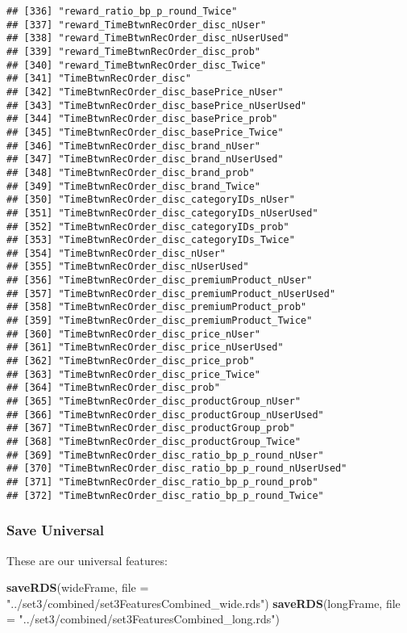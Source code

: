 \documentclass[10pt]{report}
\newenvironment{Shaded}{}{}
\newcommand{\KeywordTok}[1]{\textcolor[rgb]{0.00,0.44,0.13}{\textbf{{#1}}}}
\newcommand{\DataTypeTok}[1]{\textcolor[rgb]{0.56,0.13,0.00}{{#1}}}
\newcommand{\StringTok}[1]{\textcolor[rgb]{0.25,0.44,0.63}{{#1}}}
\newcommand{\NormalTok}[1]{{#1}}
\begin{document}
\begin{verbatim}
## [336] "reward_ratio_bp_p_round_Twice"                      
## [337] "reward_TimeBtwnRecOrder_disc_nUser"                 
## [338] "reward_TimeBtwnRecOrder_disc_nUserUsed"             
## [339] "reward_TimeBtwnRecOrder_disc_prob"                  
## [340] "reward_TimeBtwnRecOrder_disc_Twice"                 
## [341] "TimeBtwnRecOrder_disc"                              
## [342] "TimeBtwnRecOrder_disc_basePrice_nUser"              
## [343] "TimeBtwnRecOrder_disc_basePrice_nUserUsed"          
## [344] "TimeBtwnRecOrder_disc_basePrice_prob"               
## [345] "TimeBtwnRecOrder_disc_basePrice_Twice"              
## [346] "TimeBtwnRecOrder_disc_brand_nUser"                  
## [347] "TimeBtwnRecOrder_disc_brand_nUserUsed"              
## [348] "TimeBtwnRecOrder_disc_brand_prob"                   
## [349] "TimeBtwnRecOrder_disc_brand_Twice"                  
## [350] "TimeBtwnRecOrder_disc_categoryIDs_nUser"            
## [351] "TimeBtwnRecOrder_disc_categoryIDs_nUserUsed"        
## [352] "TimeBtwnRecOrder_disc_categoryIDs_prob"             
## [353] "TimeBtwnRecOrder_disc_categoryIDs_Twice"            
## [354] "TimeBtwnRecOrder_disc_nUser"                        
## [355] "TimeBtwnRecOrder_disc_nUserUsed"                    
## [356] "TimeBtwnRecOrder_disc_premiumProduct_nUser"         
## [357] "TimeBtwnRecOrder_disc_premiumProduct_nUserUsed"     
## [358] "TimeBtwnRecOrder_disc_premiumProduct_prob"          
## [359] "TimeBtwnRecOrder_disc_premiumProduct_Twice"         
## [360] "TimeBtwnRecOrder_disc_price_nUser"                  
## [361] "TimeBtwnRecOrder_disc_price_nUserUsed"              
## [362] "TimeBtwnRecOrder_disc_price_prob"                   
## [363] "TimeBtwnRecOrder_disc_price_Twice"                  
## [364] "TimeBtwnRecOrder_disc_prob"                         
## [365] "TimeBtwnRecOrder_disc_productGroup_nUser"           
## [366] "TimeBtwnRecOrder_disc_productGroup_nUserUsed"       
## [367] "TimeBtwnRecOrder_disc_productGroup_prob"            
## [368] "TimeBtwnRecOrder_disc_productGroup_Twice"           
## [369] "TimeBtwnRecOrder_disc_ratio_bp_p_round_nUser"       
## [370] "TimeBtwnRecOrder_disc_ratio_bp_p_round_nUserUsed"   
## [371] "TimeBtwnRecOrder_disc_ratio_bp_p_round_prob"        
## [372] "TimeBtwnRecOrder_disc_ratio_bp_p_round_Twice"
\end{verbatim}

\subsubsection{Save Universal}\label{save-universal-3}

These are our universal features:

\begin{Shaded}
\begin{Highlighting}[]
\KeywordTok{saveRDS}\NormalTok{(wideFrame, }\DataTypeTok{file =} \StringTok{"../set3/combined/set3FeaturesCombined_wide.rds"}\NormalTok{)}
\KeywordTok{saveRDS}\NormalTok{(longFrame, }\DataTypeTok{file =} \StringTok{"../set3/combined/set3FeaturesCombined_long.rds"}\NormalTok{)}
\end{Highlighting}
\end{Shaded}
\end{document}
